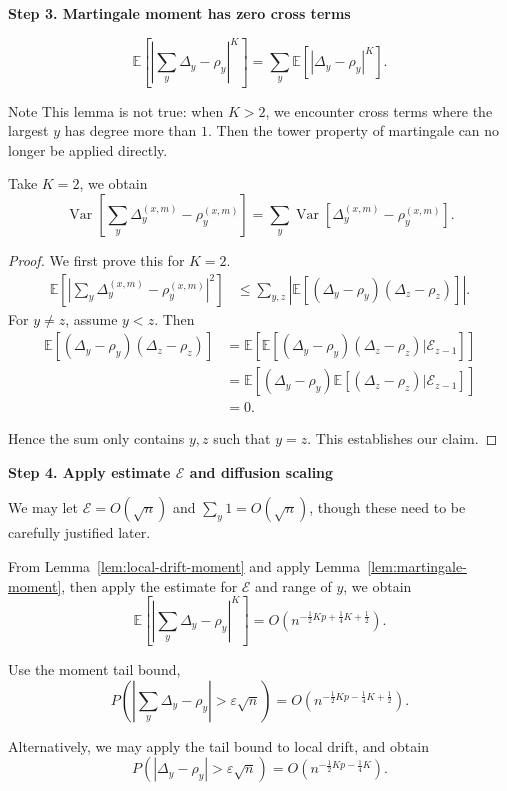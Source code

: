 \textbf{Step 3. Martingale moment has zero cross terms}

\begin{lemma}
	\[
		\mathbb{E}\left[ \left| \sum_y \Delta_y - \rho_y \right| ^K \right]
		=
		\sum_y \mathbb{E}\left[ \left| \Delta_y - \rho_y \right| ^K \right]
	.\] 
	\label{lem:martingale-moment}
\end{lemma}
\begin{note}{Note}
	This lemma is not true: when $K > 2$, we encounter cross terms where the largest $y$ has degree more than $1$. Then the tower property of martingale can no longer be applied directly.
\end{note}
\begin{lemma}
	Take $K = 2$, we obtain
	\[
	\operatorname{Var} \left[ \sum_y \Delta_y^{(x,m)} - \rho_y^{(x,m)} \right]  
		=
		\sum_y \operatorname{Var}  \left[  \Delta_y^{(x,m)} - \rho_y^{(x,m)} \right]  
	.\] 
\end{lemma}

\begin{proof}
	We first prove this for $K = 2$.
	\begin{align*}
		\mathbb{E}\left[ \left| \sum_y \Delta_y^{(x,m)} - \rho_y^{(x,m)} \right|^2 \right] 
		&\le \sum_{y, z} 
		\left|  \mathbb{E}\left[ \left( \Delta_y - \rho_y \right) (\Delta_z - \rho_z) \right]  \right|
	.\end{align*}
	For $y \neq z$, assume $y < z$. Then
	\begin{align*}
		\mathbb{E}\left[ \left( \Delta_y - \rho_y \right) (\Delta_z - \rho_z) \right]
		&= \mathbb{E}\left[ \mathbb{E} \left[ \left( \Delta_y - \rho_y \right) (\Delta_z - \rho_z) | \mathcal{E}_{z-1}\right] \right]\\
		&= \mathbb{E}\left[ \left( \Delta_y - \rho_y \right) \mathbb{E} \left[  (\Delta_z - \rho_z) | \mathcal{E}_{z-1}\right] \right]\\
		&= 0
	.\end{align*}

	Hence the sum only contains $y, z$ such that  $y = z$. This establishes our claim.
\end{proof}



\textbf{Step 4. Apply estimate  $\mathcal{E}$ and diffusion scaling}

We may let $\mathcal{E} = O(\sqrt{n}) $ and $\sum_y 1  = O(\sqrt{n} )$, though these need to be carefully justified later.

From Lemma~\ref{lem:local-drift-moment} and apply Lemma~\ref{lem:martingale-moment}, then apply the estimate for $\mathcal{E}$ and range of $y$, we obtain
\[
		\mathbb{E}\left[ \left| \sum_y \Delta_y - \rho_y \right| ^K \right]
		= O\left( n^{-\frac{1}{2} K p + \frac{1}{4} K + \frac{1}{2}} \right) 
.\] 

Use the moment tail bound, 
\[
		P\left( \left| \sum_y \Delta_y - \rho_y \right| > \varepsilon \sqrt{n}  \right)
		= O\left( n^{-\frac{1}{2} K p - \frac{1}{4} K + \frac{1}{2}} \right) 
.\]

Alternatively, we may apply the tail bound to local drift, and obtain
\[
		P\left( \left| \Delta_y - \rho_y \right| > \varepsilon \sqrt{n}  \right)
		= O\left( n^{-\frac{1}{2} K p - \frac{1}{4} K} \right) 
.\]

